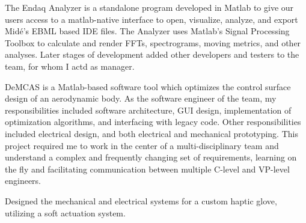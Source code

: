 \documentclass[letterpaper]{deedy-resume} %
\begin{document}
The Endaq Analyzer is a standalone program developed in Matlab to give our users access to a matlab-native interface to open, visualize, analyze, and export Midé's EBML based IDE files.  The Analyzer uses Matlab's Signal Processing Toolbox to calculate and render FFTs, spectrograms, moving metrics, and other analyses.  Later stages of development added other developers and testers to the team, for whom I actd as manager.

\sectionspace %



DeMCAS is a Matlab-based software tool which optimizes the control surface design of an aerodynamic body.  As the software engineer of the team, my responsibilities included software architecture, GUI design, implementation of optimization algorithms, and interfacing with legacy code.  Other responsibilities included electrical design, and both electrical and mechanical prototyping.  This project required me to work in the center of a multi-disciplinary team and understand a complex and frequently changing set of requirements, learning on the fly and facilitating communication between multiple C-level and VP-level engineers.

\sectionspace %



Designed the mechanical and electrical systems for a custom haptic glove, utilizing a soft actuation system.  

\sectionspace %


\end{document}
